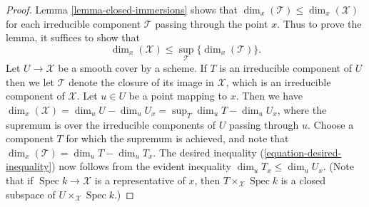 \documentclass[10pt,a4paper]{amsart}
\theoremstyle{plain}
\theoremstyle{definition}
\theoremstyle{remark}
\numberwithin{equation}{subsection}
\def\Spec{\mathop{\mathrm{Spec}}}
\begin{document}
\begin{proof}
Lemma \ref{lemma-closed-immersions}
shows that
$\dim_x (\mathcal{T}) \leq \dim_x(\mathcal{X})$ for each
irreducible component $\mathcal{T}$ passing through
the point $x$.   Thus to prove the lemma,
it suffices to show that
\begin{equation}
\label{equation-desired-inequality}
\dim_x(\mathcal{X}) \leq
\sup_{\mathcal{T}} \{\dim_x(\mathcal{T})\}.
\end{equation}
Let $U\to\mathcal{X}$ be a smooth cover by a scheme. If $T$ is an irreducible
component of $U$ then we let $\mathcal{T}$ denote the closure of its image
in $\mathcal{X}$, which is an irreducible component of $\mathcal{X}$. Let
$u \in U$ be
a point mapping to $x$. Then we have
$\dim_x(\mathcal{X})=\dim_uU-\dim_uU_x=\sup_T\dim_uT-\dim_uU_x$, where the
supremum is over the irreducible components of $U$ passing
through $u$. Choose a component $T$ for which the supremum
is achieved, and note that
$\dim_x(\mathcal{T})=\dim_uT-\dim_u T_x$.
The desired inequality (\ref{equation-desired-inequality})
now follows from the evident inequality $\dim_u T_x \leq \dim_u U_x.$
(Note that if $\Spec k \to \mathcal{X}$ is a representative of $x$,
then $T\times_{\mathcal{X}} \Spec k$ is a closed subspace of
$U\times_{\mathcal{X}}
\Spec k$.)
\end{proof}
\end{document}
